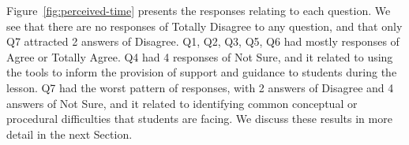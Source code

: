 Figure~\ref{fig:perceived-time} presents the responses relating to each
question. We see that there are no responses of Totally Disagree to any question,
and that only Q7 attracted 2 answers of Disagree. Q1, Q2, Q3, Q5, Q6
had mostly responses of Agree or Totally Agree. Q4 had 4 responses of
Not Sure, and it related to using the tools to inform the provision of
support and guidance to students during the lesson. Q7 had the worst
pattern of responses, with 2 answers of Disagree and 4 answers of Not
Sure, and it related to identifying common conceptual or procedural
difficulties that students are facing. We discuss these results in
more detail in the next Section.




